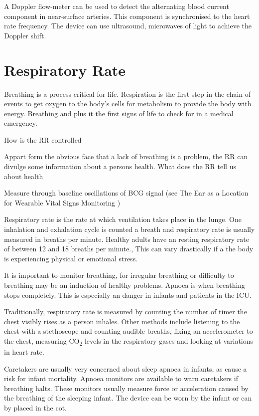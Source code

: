 A Doppler flow-meter can be used to detect the alternating blood current component in near-surface arteries. This component is synchronised to the heart rate frequency. The device can use ultrasound, microwaves of light to achieve the Doppler shift.

\section{Respiratory Rate}
Breathing is a process critical for life. Respiration is the first step in the chain of events to get oxygen to the body's cells for metabolism to provide the body with energy. Breathing and plus it the first signs of life to check for in a medical emergency. %

How is the RR controlled

Appart form the obvious face that a lack of breathing is a problem, the RR can divulge some information about a persons health. What does the RR tell us about health


Measure through baseline oscillations of BCG signal (see The Ear as a Location for Wearable Vital Signs Monitoring \citep{da2010ear})

Respiratory rate is the rate at which ventilation takes place in the lunge. One inhalation and exhalation cycle is counted a breath and respiratory rate is usually measured in breaths per minute. Healthy adults have an resting respiratory rate of between 12 and 18 breaths per minute., This can vary drastically if a the body is experiencing physical or emotional stress.

It is important to monitor breathing, for irregular breathing or difficulty to breathing may be an induction of healthy problems. Apnoea is when breathing stops completely. This is especially an danger in infants and patients in the ICU.

Traditionally, respiratory rate is measured by counting the number of timer the chest visibly rises as a person inhales. Other methods include listening to the chest with a stethoscope and counting audible breaths, fixing an accelerometer to the chest, measuring CO\textsubscript{2} levels in the respiratory gases and looking at variations in heart rate.

Caretakers are usually very concerned about sleep apnoea in infants, as cause a risk for infant mortality. Apnoea monitors are available to warn caretakers if breathing halts. These monitors usually measure force or acceleration caused by the breathing of the sleeping infant. The device can be worn by the infant or can by placed in the cot.


